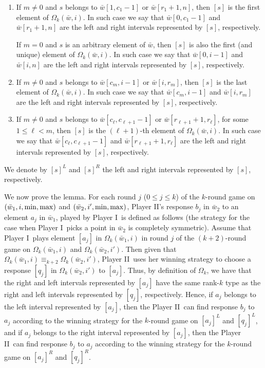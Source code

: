 \documentclass{LMCS}
\newcommand{\dupl}{Player II}
\newcommand{\spoiler}{Player I}
\newcommand{\w}{{\bar{w}}}
\renewcommand{\l}{\ell}
\theoremstyle{plain}
\theoremstyle{definition}
\begin{document}
\begin{enumerate}[$\bullet$]

\item If $m\neq 0$ and $s$ belongs to $\w[1,c_1-1]$ or
$\w[r_1+1,n]$, then $[s]$ is the first element of
$\Omega_k(\w,i)$. In such case we say that $\w[0,c_1-1]$ and
$\w[r_1+1,n]$ are the left and right intervals represented by
$[s]$, respectively. 

If $m = 0$ and $s$ is an arbitrary
element of $\w$, then $[s]$ is also the first (and unique) element of
$\Omega_k(\w,i)$. In such case we say that $\w[0,i-1]$ and
$\w[i,n]$ are the left and right intervals represented by $[s]$,
respectively.

\item 
If $m \neq 0$ and $s$ belongs to $\w[c_m,i-1]$ or $\w[i,r_m]$, then
$[s]$ is the last element of $\Omega_k(\w,i)$. 
In such case we say that
$\w[c_m,i-1]$ and $\w[i,r_m]$ are the left and right intervals 
represented by $[s]$, 
respectively.  

\item 
If $m \neq 0$ and $s$ belongs to $\w[c_\l,c_{\l+1}-1]$ or
$\w[r_{\l+1}+1,r_\l]$, for some $1 \leq \l < m$, then
$[s]$ is the $(\l+1)$-th element of $\Omega_k(\w,i)$. 
In such case we say that
$\w[c_\l,c_{\l+1}-1]$ and 
$\w[r_{\l+1}+1,r_\l]$ are the left and right intervals represented by $[s]$, 
respectively.  

\end{enumerate} We denote by $[s]^L$ and $[s]^R$ the left and right
intervals represented by $[s]$, respectively.

We now prove the lemma.  For each round $j$ ($0 \leq j \leq k$) of the
$k$-round game on $(\w_1,i,\min,\maxx)$ and $(\w_2,i',\min,\maxx)$,
\dupl's response $b_j$ in $\w_2$ to an element $a_j$ in $\w_1$, played
by \spoiler\, is defined as follows (the strategy for the case when
\spoiler\ picks a point in $\w_2$ is completely symmetric). Assume
that \spoiler\ plays element $[a_j]$ in $\Omega_k(\w_1,i)$ in round
$j$ of the $(k+2)$-round game on $\Omega_k(\w_1,i)$ and
$\Omega_k(\w_2,i')$. Then given that $\Omega_k(\w_1,i) \equiv_{k+2}
\Omega_k(\w_2,i')$, \dupl\ uses her winning strategy to choose a
response $[q_j]$ in $\Omega_k(\w_2,i')$ to $[a_j]$. Thus, by
definition of $\Omega_k$, we have that the right and left intervals
represented by $[a_j]$ have the same rank-$k$ type as the right and
left intervals represented by $[q_j]$, respectively. Hence, if $a_j$
belongs to the left interval represented by $[a_j]$, then the \dupl\
can find response $b_j$ to $a_j$ according to the winning strategy for
the $k$-round game on $[a_j]^L$ and $[q_j]^L$, and if $a_j$ belongs to
the right interval represented by $[a_j]$, then the \dupl\ can find
response $b_j$ to $a_j$ according to the winning strategy for the
$k$-round game on $[a_j]^R$ and $[q_j]^R$.
\end{document}
